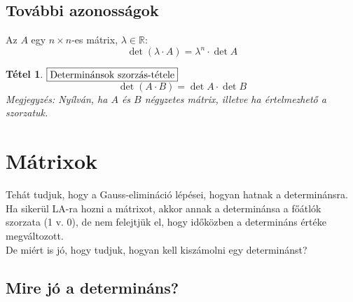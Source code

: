 \documentclass[a4paper,12pt,twoside]{book}
\newcommand{\R}{\mathbb{R}}
\newtheorem{tetel}{Tétel}[chapter]
\theoremstyle{break}
\begin{document}
\subsection{További azonosságok}

Az $A$ egy $n\times n$-es mátrix, $\lambda\in\R$:
\[\det(\lambda\cdot A) = \lambda^n\cdot\det A\]

\begin{tetel}
 $\boxed{$Determinánsok szorzás-tétele$}$\\
 \[\det(A\cdot B) = \det A\cdot \det B\]
 \emph{Megjegyzés}: Nyílván, ha $A$ és $B$ négyzetes mátrix, illetve ha értelmezhető a szorzatuk.
\end{tetel}
\addtocounter{biz}{1} %

\section{Mátrixok}

Tehát tudjuk, hogy a Gauss-elimináció lépései, hogyan hatnak a determinánsra. Ha sikerül LA-ra hozni a mátrixot, akkor annak a determinánsa a főátlók szorzata (1 v. 0), de nem felejtjük el, hogy időközben a determináns értéke megváltozott.\\

De miért is jó, hogy tudjuk, hogyan kell kiszámolni egy determinánst?

\subsection{Mire jó a determináns?}
\end{document}
